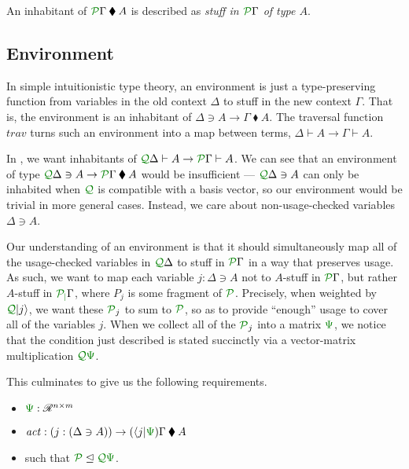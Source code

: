 \documentclass[submission,copyright,creativecommons]{eptcs}
\newcommand{\kitrel}{\mathbin{\blacklozenge}}
\begin{document}
An inhabitant of $\ctx{\Gamma}{P} \kitrel A$ is described as
\emph{stuff in $\ctx{\Gamma}{P}$ of type $A$}.

\subsection{Environment}

In simple intuitionistic type theory, an environment is just a type-preserving
function from variables in the old context $\Delta$ to stuff in the new context
$\Gamma$.
That is, the environment is an inhabitant of
$\Delta \ni A \to \Gamma \kitrel A$.
The traversal function $\mathit{trav}$ turns such an environment into a map
between terms, $\Delta \vdash A \to \Gamma \vdash A$.

In \name, we want inhabitants of
$\ctx{\Delta}{Q} \vdash A \to \ctx{\Gamma}{P} \vdash A$.
We can see that an environment of type
$\ctx{\Delta}{Q} \ni A \to \ctx{\Gamma}{P} \kitrel A$ would
be insufficient --- $\ctx{\Delta}{Q} \ni A$ can only be inhabited when
$\resctx Q$ is compatible with a basis vector, so our environment would be
trivial in more general cases.
Instead, we care about non-usage-checked variables $\Delta \ni A$.

Our understanding of an environment is that it should simultaneously map all of
the usage-checked variables in $\ctx{\Delta}{Q}$ to stuff in $\ctx{\Gamma}{P}$
in a way that preserves usage.
As such, we want to map each variable $j : \Delta \ni A$ not to $A$-stuff in
$\ctx{\Gamma}{P}$, but rather $A$-stuff in $\ctx{\Gamma}{P_j}$, where $P_j$ is
some fragment of $\resctx P$.
Precisely, when weighted by $\resctx Q\lvert j \rangle$, we want these
$\resctx P_j$ to sum to $\resctx P$, so as to provide ``enough'' usage to cover
all of the variables $j$.
When we collect all of the $\resctx P_j$ into a matrix $\rescomment\Psi$, we
notice that the condition just described is stated succinctly via a
vector-matrix multiplication $\resctx Q\rescomment\Psi$.


This culminates to give us the following requirements.

\begin{itemize}
  \item $\rescomment\Psi : \mathscr R^{n \times m}$
  \item $\mathit{act} :
    (j : (\Delta \ni A)) \to (\langle j \rvert\rescomment\Psi)\Gamma \kitrel A$
  \item such that $\resctx P \subres \resctx Q \rescomment\Psi$.
\end{itemize}
\end{document}
